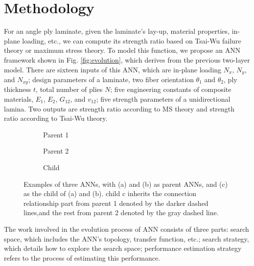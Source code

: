\section{Methodology}
For an angle ply laminate, given the laminate's lay-up, material properties,
in-plane loading, etc., we can compute its strength ratio based on Tsai-Wu
failure theory or maximum stress theory. To model this function, we propose an
ANN framework shown in Fig. \ref{fig:evolution}, which derives from the previous
two-layer model. There are sixteen inputs of this ANN, which are in-plane
loading $N_x$, $N_y$, and $N_{xy}$; design parameters of a laminate, two 
fiber orientation $\theta_1$ and $\theta_2$, ply thickness $t$, total
number of plies $N$; 
five engineering constants of composite materials,
$E_1$, $E_2$, $G_{12}$, and $v_{12}$; five strength parameters of a
unidirectional lamina.  Two outputs are strength ratio according to MS theory
and strength ratio according to Tsai-Wu theory.


\begin{figure}[!tb]
	\centering
	\begin{subfigure}[b]{1.0\linewidth}
		\centering
		
		\caption{Parent 1}
	\end{subfigure}
	\newline
	\begin{subfigure}[b]{1.0\linewidth}
		\centering
		
		\caption{Parent 2}
	\end{subfigure}
	\newline
	\begin{subfigure}[b]{1.0\linewidth}
		\centering
		
		\caption{Child}
	\end{subfigure}
	\caption{Examples of three ANNs, with (a) and (b) as parent ANNs, and (c) as
		the child of (a) and (b). child c inherits the connection relationship
		part from parent 1 denoted by the darker dashed lines,and the rest from
		parent 2 denoted by the gray dashed line.}
		\label{fig:anns}
\end{figure}


The work involved in the evolution process of ANN consists of three parts:
search space, which includes the ANN's topology, transfer function, etc.;
search strategy, which details how to explore the search space; performance
estimation strategy refers to the process of estimating this performance.

